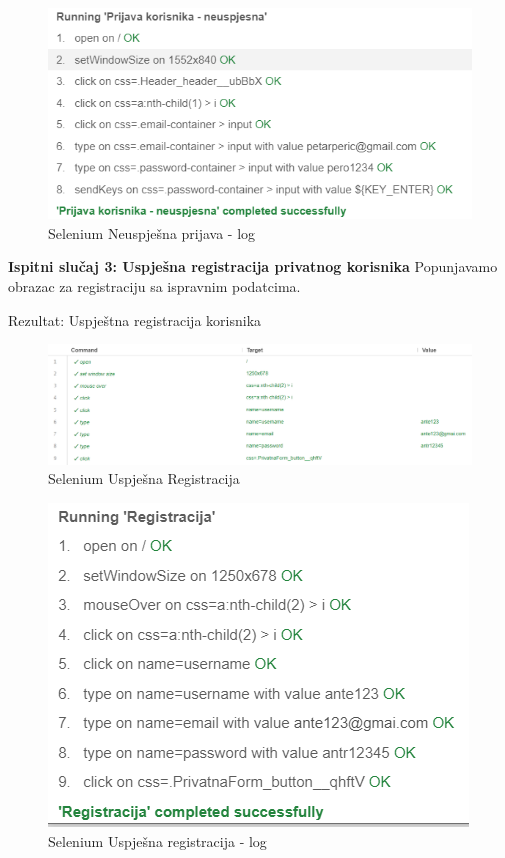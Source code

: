 \begin{figure}[H]
			\includegraphics[scale=0.8]{slike/NeuspjesnaPrijava2.png}
			\centering
			\caption{Selenium Neuspješna prijava - log}
			\label{fig:promjene}
		          \end{figure}

    \textbf{Ispitni slučaj 3: Uspješna registracija privatnog korisnika}
    Popunjavamo obrazac za registraciju sa ispravnim podatcima.
    
    Rezultat: Uspještna registracija korisnika

    \begin{figure}[H]
			\includegraphics[scale=0.5]{slike/UspjesnaRegistracija1.png}
			\centering
			\caption{Selenium Uspješna Registracija}
			\label{fig:promjene}
		          \end{figure}


\begin{figure}[H]
			\includegraphics[scale=0.8]{slike/UspjesnaRegistracija2.png}
			\centering
			\caption{Selenium Uspješna registracija - log}
			\label{fig:promjene}
		          \end{figure}
    
